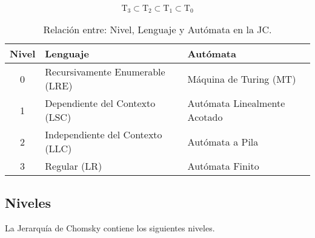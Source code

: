 \begin{equation}
\text{T}_3 \subset \text{T}_2 \subset \text{T}_1 \subset \text{T}_0
\end{equation}


\begin{table}[h]
\begin{center}

\begin{tabular}{|c|l|l|}\hline
\textbf{Nivel} & \textbf{Lenguaje} & \textbf{Autómata} \\ \hline
\hline
0 & Recursivamente Enumerable (LRE) & Máquina de Turing (MT) \\ \hline
1 & Dependiente del Contexto (LSC) & Autómata Linealmente Acotado \\ \hline
2 & Independiente del Contexto (LLC) & Autómata a Pila \\ \hline
3 & Regular (LR) & Autómata Finito \\ \hline
\end{tabular}

\caption{Relación entre: Nivel, Lenguaje y Autómata en la JC.}

\end{center}
\end{table}

\subsection{Niveles}

La Jerarquía de Chomsky contiene los
siguientes niveles.

